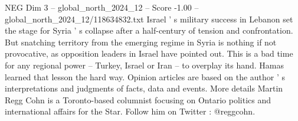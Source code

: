 \begin{textsample}{NEG Dim 3 – global\_north\_2024\_12 – Score -1.00 – global\_north\_2024\_12/118634832.txt}
Israel ' s military success in Lebanon set the stage for Syria ' s collapse after a half-century of tension and confrontation.
But snatching territory from the emerging regime in Syria is nothing if not provocative, as opposition leaders in Israel have pointed out.
This is a bad time for any regional power -- Turkey, Israel or Iran -- to overplay its hand.
Hamas learned that lesson the hard way.
Opinion articles are based on the author ' s interpretations and judgments of facts, data and events.
More details Martin Regg Cohn is a Toronto-based columnist focusing on Ontario politics and international affairs for the Star.
Follow him on Twitter : @reggcohn.

\end{textsample}

